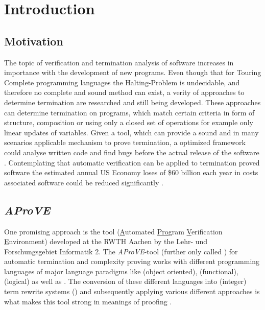 \chapter{Introduction}

\section{Motivation}
The topic of verification and termination analysis of software increases in importance with the development of new programs. Even though that for Touring Complete programming languages the Halting-Problem is undecidable, and therefore no complete and sound method can exist, a verity of approaches to determine termination are researched and still being developed. These approaches can determine termination on programs, which match certain criteria in form of structure, composition or using only a closed set of operations for example only linear updates of variables. \newline
Given a tool, which can provide a sound and in many scenarios applicable mechanism to prove termination, a optimized framework could analyse written code and find bugs before the actual release of the software \cite{verschaetse1993automatic}. Contemplating that automatic verification can be applied to termination proved software the estimated annual US Economy loses of \$60 billion each year in costs associated software could be reduced significantly \cite{zhivich2009real}. \newline

\section{\emph{AProVE}}
\label{sec:aprove}
One promising approach is the tool \aprove (\underline{A}utomated \underline{Pro}gram \underline{V}erification \underline{E}nvironment) developed at the RWTH Aachen by the Lehr- und Forschungsgebiet Informatik 2. The \emph{AProVE}-tool (further only called \aprove) for automatic termination and complexity proving works with different programming languages of major language paradigms like  (object oriented),  (functional),  (logical) as well as . The conversion of these different languages into (integer) term rewrite systems (\its) and subsequently applying various different approaches is what makes this tool strong in meanings of proofing \cite{giesl2017analyzing}.

